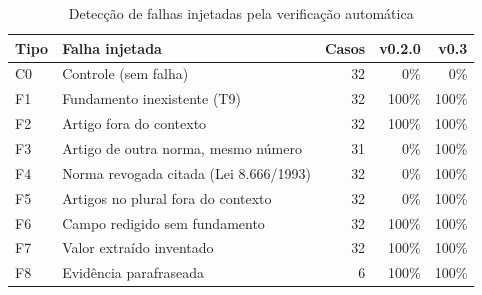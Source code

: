 \begin{table}[htbp]
\caption{Detecção de falhas injetadas pela verificação automática}\label{tab:verificacao}
\centering\small
\setlength{\tabcolsep}{4pt}
\begin{tabular}{llrrr}
\toprule
Tipo & Falha injetada & Casos & v0.2.0 & v0.3 \\
\midrule
C0 & Controle (sem falha) & 32 & 0\% & 0\% \\
F1 & Fundamento inexistente (T9) & 32 & 100\% & 100\% \\
F2 & Artigo fora do contexto & 32 & 100\% & 100\% \\
F3 & Artigo de outra norma, mesmo número & 31 & 0\% & 100\% \\
F4 & Norma revogada citada (Lei 8.666/1993) & 32 & 0\% & 100\% \\
F5 & Artigos no plural fora do contexto & 32 & 0\% & 100\% \\
F6 & Campo redigido sem fundamento & 32 & 100\% & 100\% \\
F7 & Valor extraído inventado & 32 & 100\% & 100\% \\
F8 & Evidência parafraseada & 6 & 100\% & 100\% \\
\bottomrule
\end{tabular}
\end{table}

